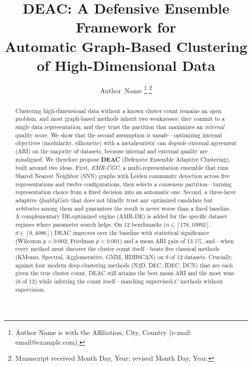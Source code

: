 \documentclass[journal]{IEEEtran}
\begin{document}
\title{DEAC: A Defensive Ensemble Framework for\\Automatic Graph-Based Clustering of High-Dimensional Data}

\author{Author~Name%
\thanks{Author Name is with the Affiliation, City, Country
(e-mail: email@example.com).}%
\thanks{Manuscript received Month Day, Year; revised Month Day, Year.}}

\maketitle

\begin{abstract}
Clustering high-dimensional data without a known cluster count remains an
open problem, and most graph-based methods inherit two weaknesses: they
commit to a single data representation, and they trust the partition that
maximizes an \emph{internal} quality score. We show that the second
assumption is unsafe---optimizing internal objectives (modularity,
silhouette) with a metaheuristic can \emph{degrade} external agreement
(ARI) on the majority of datasets, because internal and external quality
are misaligned. We therefore propose \textbf{DEAC} (Defensive Ensemble
Adaptive Clustering), built around two ideas. First, \emph{EMR-CGC}, a
multi-representation ensemble that runs Shared Nearest Neighbor (SNN)
graphs with Leiden community detection across five representations and
twelve configurations, then selects a consensus partition---turning
representation choice from a fixed decision into an automatic one. Second,
a three-layer adaptive \emph{QualityGate} that does not blindly trust any
optimized candidate but \emph{arbitrates} among them and guarantees the
result is never worse than a fixed baseline. A complementary
DE-optimized engine (AMR-DE) is added for the specific dataset regimes
where parameter search helps. On 12 benchmarks ($n \in [178, 10992]$,
$d \in [9, 4096]$) DEAC improves over the baseline with statistical
significance (Wilcoxon $p{=}0.002$, Friedman $p{<}0.001$) and a mean ARI
gain of 13.1\%, and---when every method must discover the cluster count
itself---beats five classical methods (KMeans, Spectral, Agglomerative, GMM,
HDBSCAN) on 9 of 12 datasets. Crucially, against four
modern deep-clustering methods (N2D, DEC, IDEC, DCN) that are each given the
true cluster count, DEAC still attains the best mean ARI and the most wins
(6 of 12) while inferring the count itself---matching supervised-$C$ methods
without supervision.
\end{abstract}
\end{document}
